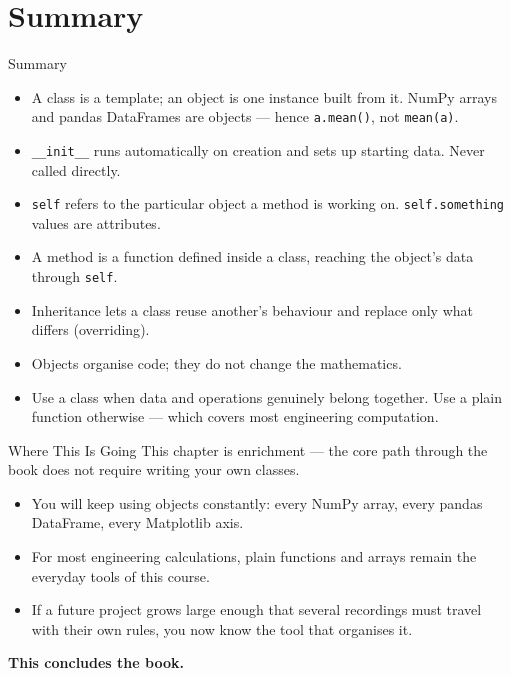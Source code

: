 \documentclass[9pt,aspectratio=169,xcolor=table]{beamer}
\begin{document}
\section{Summary}

\begin{frame}{Summary}
    \leavevmode
    \small
    \begin{itemize}\itemsep3pt
        \item A \alert{class} is a template; an \alert{object} is one
              instance built from it. NumPy arrays and pandas DataFrames
              are objects --- hence \texttt{a.mean()}, not
              \texttt{mean(a)}.
        \item \texttt{\_\_init\_\_} runs automatically on creation and
              sets up starting data. Never called directly.
        \item \texttt{self} refers to the particular object a method is
              working on. \texttt{self.something} values are
              \alert{attributes}.
        \item A \alert{method} is a function defined inside a class,
              reaching the object's data through \texttt{self}.
        \item \alert{Inheritance} lets a class reuse another's behaviour
              and replace only what differs (\alert{overriding}).
        \item Objects organise code; they do not change the mathematics.
        \item Use a class when data and operations genuinely belong
              together. Use a plain function otherwise --- which covers
              most engineering computation.
    \end{itemize}
\end{frame}

\begin{frame}{Where This Is Going}
    \leavevmode
    \small
    This chapter is enrichment --- the core path through the book does
    not require writing your own classes.

    \vspace{3mm}
    \begin{itemize}
        \item You will keep \alert{using} objects constantly: every
              NumPy array, every pandas DataFrame, every Matplotlib axis.
        \item For most engineering calculations, plain functions and
              arrays remain the everyday tools of this course.
        \item If a future project grows large enough that several
              recordings must travel with their own rules, you now know
              the tool that organises it.
    \end{itemize}

    \vspace{4mm}
    \begin{center}
        \large\color{primary}\textbf{This concludes the book.}
    \end{center}
\end{frame}
\end{document}
